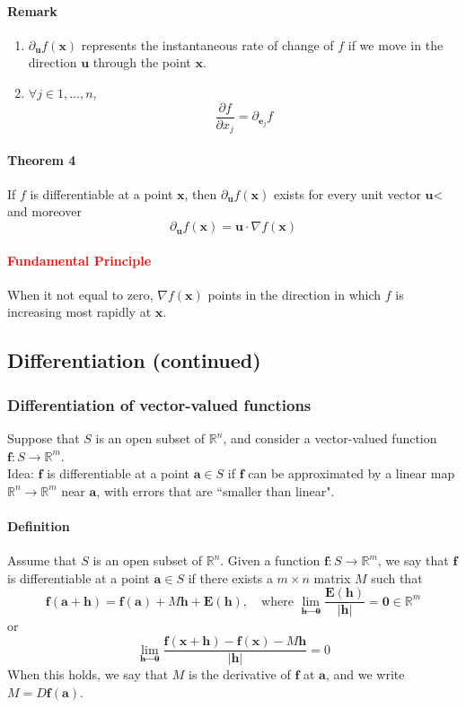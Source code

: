 \documentclass[11pt]{article}
\newcommand{\tb}[1]{\textbf{#1}}
\newcommand{\real}[0]{\mathbb{R}}
\newcommand{\vx}[0]{\tb{x}}
\newcommand{\vo}[0]{\tb{0}}
\newcommand{\va}[0]{\tb{a}}
\newcommand{\ve}[0]{\tb{e}}
\newcommand{\vh}[0]{\tb{h}}
\newcommand{\vu}[0]{\tb{u}}
\newcommand{\ff}[0]{\tb{f}}
\newcommand{\p}[0]{\partial}
\begin{document}
\paragraph{Remark}
\begin{enumerate}
	\item $\p_\vu f(\vx)$ represents the instantaneous rate of change of $f$ if we move in the direction $\vu$ through the point $\vx$.
	\item $\forall j \in {1, \hdots, n}$, $$\frac{\p f}{\p x_j} = \p_{\ve_j}f$$
\end{enumerate}
\paragraph{Theorem 4} If $f$ is differentiable at a point $\vx$, then $\p_\vu f(\vx)$ exists for every unit vector $\vu$< and moreover 
$$\p_\vu f(\vx) = \vu \cdot \nabla f(\vx)$$
\paragraph{\textcolor{red}{Fundamental Principle}} When it not equal to zero, $\nabla f(\vx)$ points in the direction in which $f$ is increasing most rapidly at $\vx$. 
\subsection{Differentiation (continued)}
\subsubsection{Differentiation of vector-valued functions}
Suppose that $S$ is an open subset of $\real^n$, and consider a vector-valued function $\tb{f}: S \rightarrow \real^m$. \\
Idea: $\tb{f}$ is differentiable at a point $\va \in S$ if $\ff$ can be approximated by a linear map $\real^n \rightarrow \real^m$ near $\va$, with errors that are ``smaller than linear".
\paragraph{Definition} Assume that $S$ is an open subset of $\real^n$. Given a function $\ff: S \rightarrow \real^m$, we say that $\ff$ is differentiable at a point $\va \in S$ if there exists a $m \times n$ matrix $M$ such that 
$$\ff(\va + \vh) = \ff(\va) + M\vh + \tb{E}(\vh), \quad \mbox{where } \underset{\vh \rightarrow \vo}{\lim} \frac{\tb{E}(\vh)}{|\vh|} = \vo \in \real^m$$
or
$$ \underset{\vh \rightarrow \vo}{\lim} \frac{\ff(\vx + \vh) - \ff(\vx) - M\vh}{|\vh|} = 0$$
When this holds, we say that $M$ is the derivative of $\ff$ at $\va$, and we write $M = D\ff(\va)$.
\end{document}
